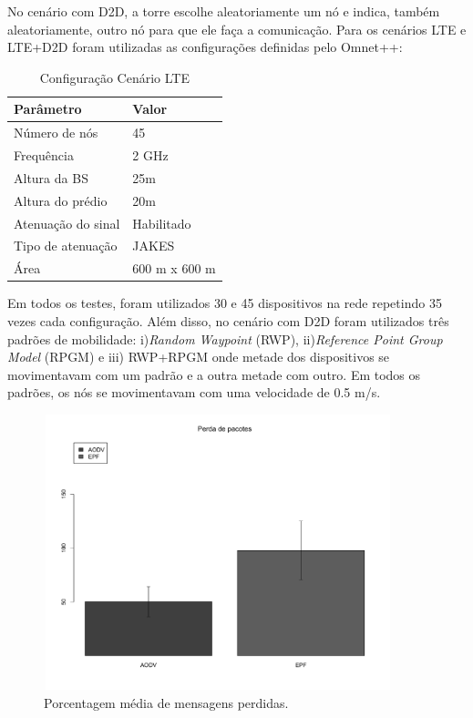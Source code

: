 \documentclass[11pt,a4paper,titlepage]{article}
\begin{document}
No cenário com D2D, a torre escolhe aleatoriamente um nó e indica, também aleatoriamente, outro nó para que ele faça a comunicação.
Para os cenários LTE e LTE+D2D foram utilizadas as configurações definidas pelo Omnet++:
\begin{table}[t]
\caption{Configuração Cenário LTE}
\centering
\begin{tabular}{| l | l |}
\hline
Parâmetro & Valor\\
\hline
Número de nós & 45 \\
\hline
Frequência & 2 GHz \\
\hline
Altura da BS & 25m \\
\hline
Altura do prédio & 20m \\
\hline
Atenuação do sinal & Habilitado\\
\hline
Tipo de atenuação & JAKES\\
\hline
Área & 600 m x 600 m\\
\hline
\end{tabular}
\label{tab:lte-param}
\end{table}

Em todos os testes, foram utilizados 30 e 45 dispositivos na rede repetindo 35 vezes cada configuração.
Além disso, no cenário com D2D foram utilizados três padrões de mobilidade: i)\textit{Random Waypoint} (RWP), ii)\textit{Reference Point Group Model} (RPGM) e iii) RWP+RPGM onde metade dos dispositivos se movimentavam com um padrão e a outra metade com outro.
Em todos os padrões, os nós se movimentavam com uma velocidade de 0.5 m/s.

\begin{figure}[ht]
\centering
\includegraphics[height=8cm, width=0.9\textwidth]{images/drop.jpg}
\caption{Porcentagem média de mensagens perdidas.}
\label{fig:drop}
\end{figure}
\end{document}
